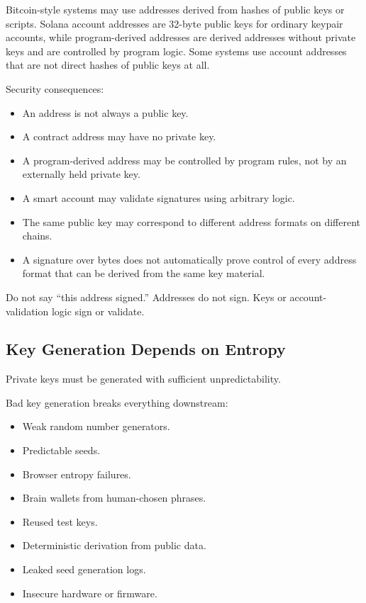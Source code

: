 Bitcoin-style systems may use addresses derived from hashes of public
keys or scripts. Solana account addresses are 32-byte public keys for
ordinary keypair accounts, while program-derived addresses are derived
addresses without private keys and are controlled by program logic. Some
systems use account addresses that are not direct hashes of public keys
at all.

Security consequences:

\begin{itemize}
\tightlist
\item
  An address is not always a public key.
\item
  A contract address may have no private key.
\item
  A program-derived address may be controlled by program rules, not by
  an externally held private key.
\item
  A smart account may validate signatures using arbitrary logic.
\item
  The same public key may correspond to different address formats on
  different chains.
\item
  A signature over bytes does not automatically prove control of every
  address format that can be derived from the same key material.
\end{itemize}

Do not say ``this address signed.'' Addresses do not sign. Keys or
account-validation logic sign or validate.

\subsection{Key Generation Depends on Entropy}

Private keys must be generated with sufficient unpredictability.

Bad key generation breaks everything downstream:

\begin{itemize}
\tightlist
\item
  Weak random number generators.
\item
  Predictable seeds.
\item
  Browser entropy failures.
\item
  Brain wallets from human-chosen phrases.
\item
  Reused test keys.
\item
  Deterministic derivation from public data.
\item
  Leaked seed generation logs.
\item
  Insecure hardware or firmware.
\end{itemize}

